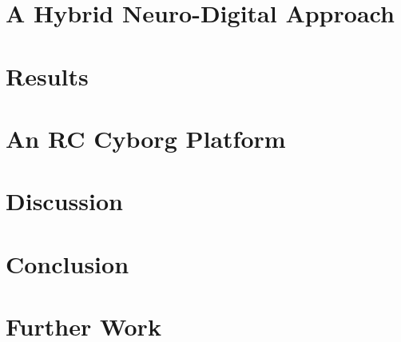 \documentclass[journal]{IEEEtran}
\begin{document}
\section{A Hybrid Neuro-Digital Approach}

\section{Results}

\section{An RC Cyborg Platform}

\section{Discussion}

\section{Conclusion}


\section{Further Work}



 

\end{document}
